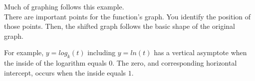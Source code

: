\documentclass{ximera}
\begin{document}
\begin{example}
\begin{image}
\end{image}








\end{example}


Much of graphing follows this example.  \\


There are important points for the function's graph. You identify the position of those points.  Then, the shifted graph follows the basic shape of the original graph.






For example, $y = log_k(t)$ including $y = ln(t)$ has a vertical asymptote when the inside of the logarithm equals $0$. The zero, and corresponding horizontal intercept, occurs when the inside equals $1$.  
\end{document}
